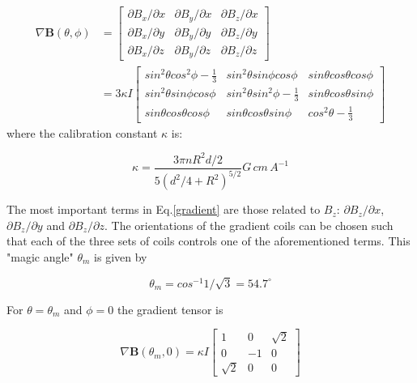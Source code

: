 \begin{equation}\label{gradient}
\begin{split}
\nabla\boldsymbol{B}(\theta, \phi)
&=\begin{bmatrix}
\partial B_x/\partial x & \partial B_y/\partial x & \partial B_z/\partial x \\
\partial B_x/\partial y & \partial B_y/\partial y & \partial B_z/\partial y \\
\partial B_x/\partial z & \partial B_y/\partial z & \partial B_z/\partial z
\end{bmatrix}\\
&=3\kappa I
\begin{bmatrix}
sin^2\theta cos^2\phi-\frac{1}{3} & sin^2\theta sin\phi cos\phi & sin\theta cos\theta cos\phi \\
sin^2\theta sin\phi cos\phi & sin^2\theta sin^2\phi-\frac{1}{3} & sin\theta cos\theta sin\phi \\
sin\theta cos\theta cos\phi & sin\theta cos\theta sin\phi & cos^2\theta-\frac{1}{3}
\end{bmatrix}
\end{split}
\end{equation}
where the calibration constant $\kappa$ is:

\begin{equation}
\kappa = \frac{3\pi n R^2 d/2}{5(d^2/4+R^2)^{5/2}}G\,cm\,A^{-1}
\end{equation}

The most important terms in Eq.\ref{gradient} are those related to $B_z$: $\partial B_z/\partial x$, $\partial B_z/\partial y$ and $\partial B_z/\partial z$. The orientations of the gradient coils can be chosen such that each of the three sets of coils controls one of the aforementioned terms. This "magic angle" $\theta_m$ is given by

\begin{equation}
\theta_m = cos^{-1}1/\sqrt{3}=54.7^{\circ}
\end{equation}

For $\theta=\theta_m$ and $\phi=0$ the gradient tensor is

\begin{equation}
\nabla\boldsymbol{B}(\theta_m, 0)=\kappa I
\begin{bmatrix}
1 & 0 & \sqrt{2}\\
0 & -1 & 0 \\
\sqrt{2} & 0 & 0
\end{bmatrix}
\end{equation}

